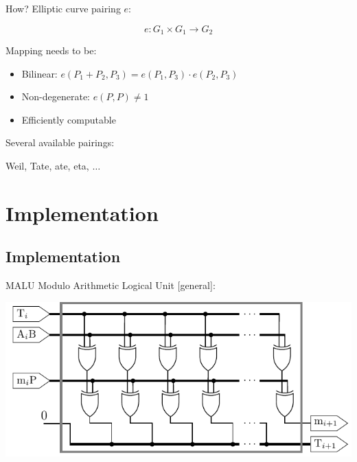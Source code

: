 \documentclass{beamer}
\begin{document}
\begin{frame}{How?}
	Elliptic curve pairing $e$:
	
	\[ e : G_1 \times G_1 \rightarrow G_2 \]
	
	Mapping needs to be:
	
	\begin{itemize}
		\item<1-> Bilinear: $e(P_1 + P_2, P_3) = e(P_1, P_3) \cdot e(P_2, P_3)$
		\item<1-> Non-degenerate: $e(P, P) \neq 1$
		\item<1-> Efficiently computable
	\end{itemize}
	
	Several available pairings:\\
	
	\begin{center}Weil, \alert{Tate}, ate, eta, $\ldots$\end{center}
\end{frame}

\section{Implementation}
\subsection*{Implementation}
\begin{frame}{MALU}
	Modulo Arithmetic Logical Unit [general]:\\[8mm]
	\begin{center}
		\includegraphics[height=0.5\paperheight]{images/malu-core-basic}
	\end{center}
\end{frame}
\end{document}
